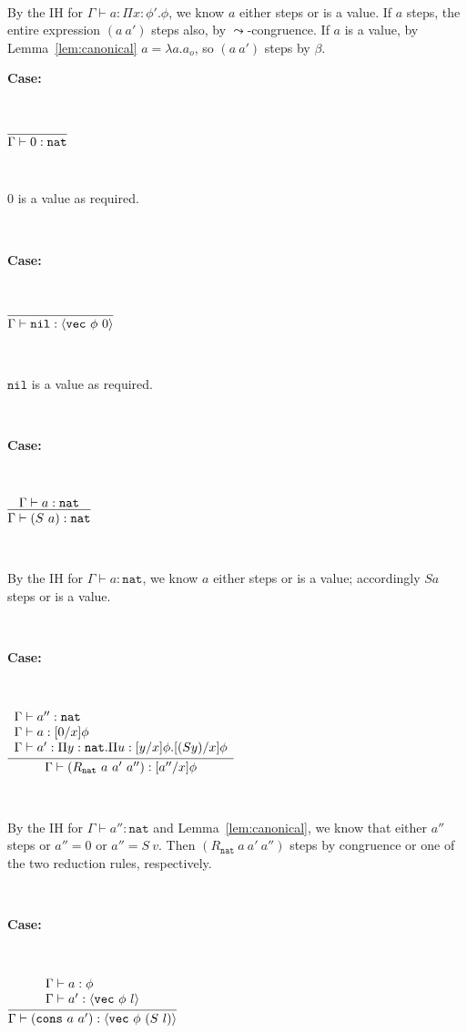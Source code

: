 \documentclass[copyright]{eptcs}
\newcommand{\vc}[0]{\texttt{vec}}
\newcommand{\nat}[0]{\texttt{nat}}
\newcommand{\nil}[0]{\texttt{nil}}
\newcommand{\cons}[0]{\texttt{cons}}
\begin{document}
\ 

\noindent By the IH for $\Gamma \vdash a:\Pi x:\phi'.\phi$, we know $a$ either steps or is a value. If $a$ steps, the entire expression $(a\ a')$ steps also, by $\leadsto$-congruence. If $a$ is a value, by Lemma~\ref{lem:canonical} $a=\lambda a.a_o$, so $(a\ a')$ steps by $\beta$.

\noindent \textbf{Case:}

\

$\infer{\Gamma\vdash 0:\nat}{\ }$

\

\noindent $0$ is a value as required.

\ 

\noindent \textbf{Case:}

\

$\infer{\Gamma\vdash \nil:\langle\vc\ \phi\ 0\rangle}{\ }$

\ 

\noindent $\nil$ is a value as required.

\ 

\noindent \textbf{Case:}

\

$\infer{\Gamma\vdash (S\ a):\nat}{\Gamma\vdash a:\nat  }$

\ 

\noindent By the IH for $\Gamma\vdash a:\nat$, we know $a$ either steps or is a value; accordingly $S a$ steps or is a value.

\ 

\noindent \textbf{Case:}

\

$\infer{\Gamma\vdash (R_\nat\ a\ a'\ a''):[a''/x]\phi}
      {\begin{array}{l}\Gamma \vdash a'' : \nat \\
       \Gamma \vdash a : [0/x]\phi \\
       \Gamma \vdash a' : \Pi y:\nat. \Pi u : [y/x]\phi. [(S y)/x]\phi
       \end{array}}$

\ 

\noindent By the IH for $\Gamma \vdash a'' : \nat$ and Lemma~\ref{lem:canonical}, we know that either $a''$ steps or $a'' = 0$ or $a'' = S\ v$. Then $(R_\nat\ a\ a'\ a'')$ steps by congruence or one of the two reduction rules, respectively.


\ 

\noindent \textbf{Case:}

\

$\infer{\Gamma\vdash (\cons\ a\ a'):\langle \vc\ \phi\ (S\ l)\rangle}
      {\begin{array}{l}\Gamma\vdash a:\phi \\ \Gamma \vdash a':\langle \vc\ \phi\ l\rangle
       \end{array}}$
\end{document}
